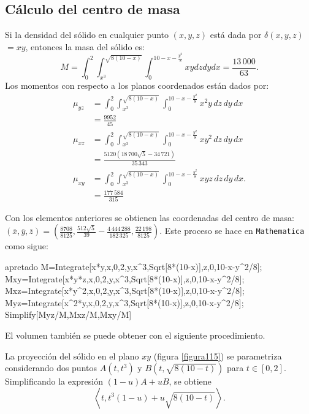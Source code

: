 \subsection{Cálculo del centro de masa}

Si la densidad del sólido en cualquier punto $(x,y,z)$ está dada por $\delta(x,y,z)$ $= xy$, entonces la masa del sólido es:
\[M=\int_0^2\int_{x^3}^{\sqrt{8 (10-x)}}\int_0^{10-x-\frac{y^2}{8}}xydzdydx=\frac{13\,000}{63}.\]
Los momentos con respecto a los planos coordenados están dados por:
\begin{align*}
\mu_{yz} &= \int _0^2\int _{x^3}^{\sqrt{8 (10-x)}}\int _0^{10-x-\frac{y^2}{8}} x^2y\,dz\,dy\,dx \\
&= \frac{9952}{45} \\[1ex]
\mu_{xz} &= \int _0^2\int _{x^3}^{\sqrt{8 (10-x)}}\int _0^{10-x-\frac{y^2}{8}} xy^2\,dz\,dy\,dx \\
&= \frac{5120 \left(18\,700 \sqrt{5}-34\,721\right)}{35\,343} \\[1ex]
\mu_{xy} &= \int _0^2\int _{x^3}^{\sqrt{8 (10-x)}}\int _0^{10-x-\frac{y^2}{8}} xyz\,dz\,dy\,dx. \\
&= \frac{177\,584}{315}
\end{align*}

Con los elementos anteriores se obtienen las coordenadas del centro de masa:
$(\overline{x},\overline{y},\overline{z})=\left(\frac{8708}{8125},\frac{512 \sqrt{5}}{39}-\frac{4\,444\,288}{182\,325},\frac{22\,198}{8125}\right)$.
Este proceso se hace en \verb"Mathematica" como sigue:

\begin{SaveVerbatim}{apretado}
M=Integrate[x*y,{x,0,2},{y,x^3,Sqrt[8*(10-x)]},{z,0,10-x-y^2/8}];
Mxy=Integrate[x*y*z,{x,0,2},{y,x^3,Sqrt[8*(10-x)]},{z,0,10-x-y^2/8}];
Mxz=Integrate[x*y^2,{x,0,2},{y,x^3,Sqrt[8*(10-x)]},{z,0,10-x-y^2/8}];
Myz=Integrate[x^2*y,{x,0,2},{y,x^3,Sqrt[8*(10-x)]},{z,0,10-x-y^2/8}];
Simplify[{Myz/M,Mxz/M,Mxy/M}]
\end{SaveVerbatim}

\begin{tcolorbox}[title=\bf Instrucción en \verb"Mathematica"]
\end{tcolorbox}

El volumen también se puede obtener con el siguiente procedimiento.

La proyección del sólido en el plano $xy$ (figura \ref{figura115})
se parametriza considerando dos puntos $A(t,t^{3})$ y $B\left( t,\sqrt{8\left( 10-t\right) }\right) $ para $t\in[0,2]$. Simplificando la expresión $(1-u)A+uB$, se obtiene
\[\left\langle t,t^{3}(1-u)+u\sqrt{8\left(10-t\right) }\right\rangle.\]

